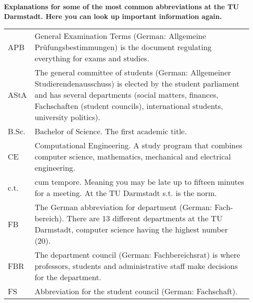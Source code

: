 
\textbf{Explanations for some of the most common abbreviations at the TU Darmstadt. Here you can look up important information again.}

\begin{longtable}{p{20mm}p{85mm}}
    APB          & General Examination Terms (German: Allgemeine Prüfungsbestimmungen) is the document regulating everything for exams and studies.                                                                                                                         \\
    AStA         & The general committee of students (German: Allgemeiner Studierendenausschuss) is elected by the student parliament and has several departments (social matters, finances, Fachschaften (student councils), international students, university politics). \\
    B.Sc.        & Bachelor of Science. The first academic title.                                                                                                                                                                                                           \\
    CE           & Computational Engineering. A study program that combines computer science, mathematics, mechanical and electrical engineering.                                                                                                                           \\
    c.t.         & cum tempore. Meaning you may be late up to fifteen minutes for a meeting. At the TU Darmstadt s.t. is the norm.                                                                                                                                          \\
    FB           & The German abbreviation for department (German: Fach-bereich). There are 13 different departments at the TU Darmstadt, computer science having the highest number (20).                                                                                  \\
    FBR          & The department council (German: Fachbereichsrat) is where professors, students and administrative staff make decisions for the department.                                                                                                               \\
    FS           & Abbreviation for the student council (German: Fachschaft).                                                                                                                                                                                               \\

\end{longtable}
